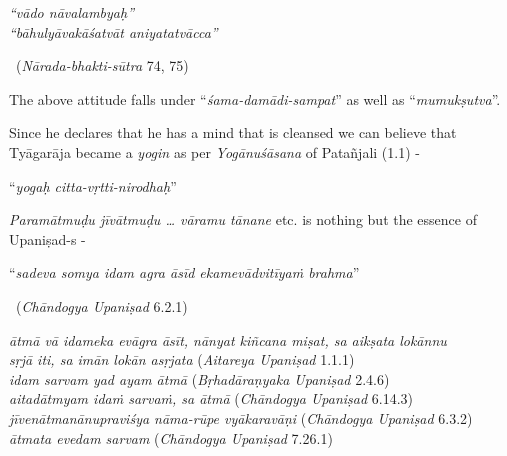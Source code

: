 \vspace{-.2cm}

\begin{centerquote}
\textit{“vādo nāvalambyaḥ”}\\ \textit{“bāhulyāvakāśatvāt aniyatatvācca”} 

~\hfill (\textit{Nārada-bhakti-sūtra} 74, 75)
\end{centerquote}

The above attitude falls under “\textit{śama-damādi-sampat}” as well as “\textit{mumukṣutva}”.

Since he declares that he has a mind that is cleansed we can believe that Tyāgarāja became a \textit{yogin} as per \textit{Yogānuśāsana} of Patañjali (1.1) -

\begin{centerquote}
“\textit{yogaḥ citta-vṛtti-nirodhaḥ}”
\end{centerquote}

\textit{Paramātmuḍu jīvātmuḍu … vāramu tānane} etc. is nothing but the essence of Upaniṣad-s -

\begin{myquote}
“\textit{sadeva somya idam agra āsīd ekamevādvitīyaṁ brahma}” 

~\hfill (\textit{Chāndogya Upaniṣad} 6.2.1)
\end{myquote}

\begin{myquote}
\textit{ātmā vā idameka evāgra āsīt, nānyat kiñcana miṣat, sa aikṣata lokānnu}\\ \textit{sṛjā iti, sa imān lokān asṛjata} (\textit{Aitareya Upaniṣad} 1.1.1)\\ \textit{idam sarvam yad ayam ātmā} (\textit{Bṛhadāraṇyaka Upaniṣad} 2.4.6)\\ \textit{aitadātmyam idaṁ sarvaṁ, sa ātmā} (\textit{Chāndogya Upaniṣad} 6.14.3)\\ \textit{jīvenātmanānupraviśya nāma-rūpe vyākaravāṇi} (\textit{Chāndogya Upaniṣad} 6.3.2)\\ \textit{ātmata evedam sarvam} (\textit{Chāndogya Upaniṣad} 7.26.1)
\end{myquote}



